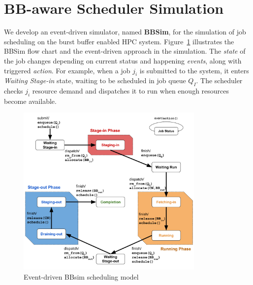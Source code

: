 

\section{BB-aware Scheduler Simulation}
\label{Sec:Simulation}

We develop an event-driven simulator, named \textbf{BBSim},
for the simulation of job scheduling on the burst buffer enabled HPC system.
Figure~\ref{Fig:JobFSM} illustrates the BBSim flow chart and the event-driven approach in the simulation.
The \textit{state} of the job changes depending on current status and
happening \textit{events}, along with triggered \textit{action}.
For example, when a job $j_i$ is submitted to the system, 
it enters \textit{Waiting Stage-in} state, 
waiting to be scheduled in job queue $Q_I$. 
The scheduler checks $j_i$ resource demand and 
dispatches it to run when enough resources become available.

\begin{figure}[!t]
\centering
        \includegraphics[width=3.6in]{3PhaseJobFSM}
        \caption{Event-driven BBsim scheduling model}
\label{Fig:JobFSM}
\end{figure}

